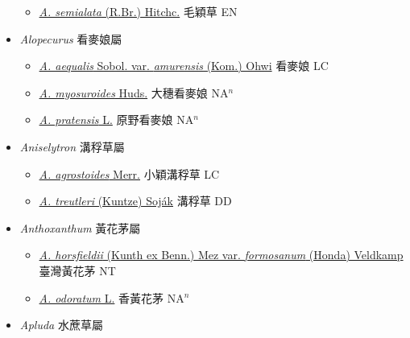 \begin{itemize}
  \begin{itemize}
        \item[] \href{http://www.theplantlist.org/tpl1.1/search?q=Alloteropsis+semialata}{\textit{A. semialata} (R.Br.) Hitchc.}   毛穎草 EN
  \end{itemize}
 \item[] \textit{Alopecurus} 看麥娘屬
                    
  \begin{itemize}
        \item[] \href{http://www.theplantlist.org/tpl1.1/search?q=Alopecurus+aequalis+var.+amurensis}{\textit{A. aequalis} Sobol. var. \textit{amurensis} (Kom.) Ohwi}   看麥娘 LC
        \item[] \href{http://www.theplantlist.org/tpl1.1/search?q=Alopecurus+myosuroides}{\textit{A. myosuroides} Huds.}   大穗看麥娘 NA$^n$
        \item[] \href{http://www.theplantlist.org/tpl1.1/search?q=Alopecurus+pratensis}{\textit{A. pratensis} L.}   原野看麥娘 NA$^n$
  \end{itemize}
 \item[] \textit{Aniselytron} 溝稃草屬
                    
  \begin{itemize}
        \item[] \href{http://www.theplantlist.org/tpl1.1/search?q=Aniselytron+agrostoides}{\textit{A. agrostoides} Merr.}   小穎溝稃草 LC
        \item[] \href{http://www.theplantlist.org/tpl1.1/search?q=Aniselytron+treutleri}{\textit{A. treutleri} (Kuntze) Soják}   溝稃草 DD
  \end{itemize}
 \item[] \textit{Anthoxanthum} 黃花茅屬
                    
  \begin{itemize}
        \item[] \href{http://www.theplantlist.org/tpl1.1/search?q=Anthoxanthum+horsfieldii+var.+formosanum}{\textit{A. horsfieldii} (Kunth ex Benn.) Mez var. \textit{formosanum} (Honda) Veldkamp}   臺灣黃花茅 NT
        \item[] \href{http://www.theplantlist.org/tpl1.1/search?q=Anthoxanthum+odoratum}{\textit{A. odoratum} L.}   香黃花茅 NA$^n$
  \end{itemize}
 \item[] \textit{Apluda} 水蔗草屬
                    

\end{itemize}
